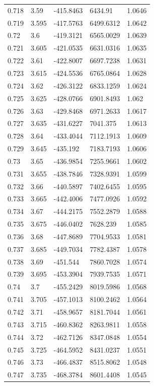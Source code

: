 \begin{tabular}{lllll}
0.718 & 3.59 & -415.8463 & 6434.91 & 1.0646 \\
0.719 & 3.595 & -417.5763 & 6499.6312 & 1.0642 \\
0.72 & 3.6 & -419.3121 & 6565.0029 & 1.0639 \\
0.721 & 3.605 & -421.0535 & 6631.0316 & 1.0635 \\
0.722 & 3.61 & -422.8007 & 6697.7238 & 1.0631 \\
0.723 & 3.615 & -424.5536 & 6765.0864 & 1.0628 \\
0.724 & 3.62 & -426.3122 & 6833.1259 & 1.0624 \\
0.725 & 3.625 & -428.0766 & 6901.8493 & 1.062 \\
0.726 & 3.63 & -429.8468 & 6971.2633 & 1.0617 \\
0.727 & 3.635 & -431.6227 & 7041.375 & 1.0613 \\
0.728 & 3.64 & -433.4044 & 7112.1913 & 1.0609 \\
0.729 & 3.645 & -435.192 & 7183.7193 & 1.0606 \\
0.73 & 3.65 & -436.9854 & 7255.9661 & 1.0602 \\
0.731 & 3.655 & -438.7846 & 7328.9391 & 1.0599 \\
0.732 & 3.66 & -440.5897 & 7402.6455 & 1.0595 \\
0.733 & 3.665 & -442.4006 & 7477.0926 & 1.0592 \\
0.734 & 3.67 & -444.2175 & 7552.2879 & 1.0588 \\
0.735 & 3.675 & -446.0402 & 7628.239 & 1.0585 \\
0.736 & 3.68 & -447.8689 & 7704.9533 & 1.0581 \\
0.737 & 3.685 & -449.7034 & 7782.4387 & 1.0578 \\
0.738 & 3.69 & -451.544 & 7860.7028 & 1.0574 \\
0.739 & 3.695 & -453.3904 & 7939.7535 & 1.0571 \\
0.74 & 3.7 & -455.2429 & 8019.5986 & 1.0568 \\
0.741 & 3.705 & -457.1013 & 8100.2462 & 1.0564 \\
0.742 & 3.71 & -458.9657 & 8181.7044 & 1.0561 \\
0.743 & 3.715 & -460.8362 & 8263.9811 & 1.0558 \\
0.744 & 3.72 & -462.7126 & 8347.0848 & 1.0554 \\
0.745 & 3.725 & -464.5952 & 8431.0237 & 1.0551 \\
0.746 & 3.73 & -466.4837 & 8515.8062 & 1.0548 \\
0.747 & 3.735 & -468.3784 & 8601.4408 & 1.0545 \\

\end{tabular}
